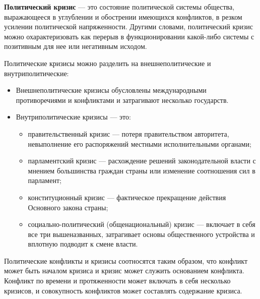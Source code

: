\documentclass[a4paper,12pt,notitlepage,pdftex,headsepline]{scrartcl}
\begin{document}
  \textbf{Политический кризис} --- это состояние политической системы
  общества, выражающееся в углублении и обострении имеющихся конфликтов, в
  резком усилении политической напряженности.
  Другими словами, политический кризис можно охарактеризовать как перерыв в
  функционировании какой-либо системы с позитивным для нее или негативным
  исходом.

  Политические кризисы можно разделить на внешнеполитические и
  внутриполитические:
  \begin{itemize}
    \item Внешнеполитические кризисы обусловлены международными противоречиями
      и конфликтами и затрагивают несколько государств.
    \item Внутриполитические кризисы --- это:
      \begin{itemize}
        \item правительственный кризис --- потеря правительством авторитета,
          невыполнение его распоряжений местными исполнительными органами;
        \item парламентский кризис --- расхождение решений законодательной
          власти с мнением большинства граждан страны или изменение
          соотношения сил в парламент;
        \item конституционный кризис --- фактическое прекращение действия
          Основного закона страны;
        \item социально-политический (общенациональный) кризис --- включает в
          себя все три вышеназванных, затрагивает основы общественного
          устройства и вплотную подводит к смене власти.
      \end{itemize}
  \end{itemize}

  Политические конфликты и кризисы соотносятся таким образом, что конфликт
  может быть началом кризиса и кризис может служить основанием конфликта.
  Конфликт по времени и протяженности может включать в себя несколько
  кризисов, и совокупность конфликтов может составлять содержание кризиса.

  \clearpage
\end{document}
